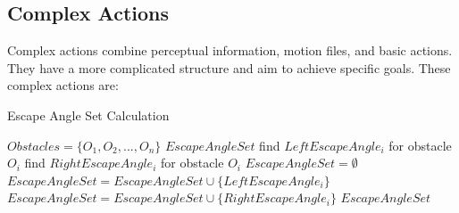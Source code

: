 \subsection{Complex Actions}
Complex actions combine perceptual information, motion files, and basic actions. They have a more complicated structure and aim to achieve specific goals. These complex actions are:

\begin{algorithm}[t!]
\caption{Escape Angle Set Calculation}
\label{AngleSet}
\begin{algorithmic}[1]
$Obstacles = \lbrace O_{1},O_{2},...,O_{n} \rbrace $
$EscapeAngleSet$
\STATE
{}
\STATE find $LeftEscapeAngle_i$ for obstacle $O_i$
\STATE find $RightEscapeAngle_i$ for obstacle $O_i$
\ENDFOR
\STATE $EscapeAngleSet = \emptyset$
\STATE $EscapeAngleSet = EscapeAngleSet \cup \{LeftEscapeAngle_i\}$
\ENDIF
{}
\STATE $EscapeAngleSet = EscapeAngleSet \cup \{RightEscapeAngle_i\}$
\ENDIF
\ENDFOR
\RETURN $EscapeAngleSet$
\end{algorithmic}
\end{algorithm}



